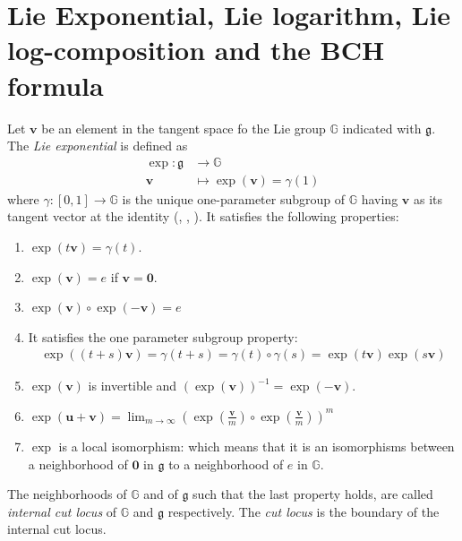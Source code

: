 \section{Lie Exponential, Lie logarithm, Lie log-composition and the BCH formula }\label{se:lie_exp_log_comp_bch}
Let $\mathbf{v}$ be an element in the tangent space fo the Lie group $\mathbb{G}$ indicated with $\mathfrak{g}$.
The \emph{Lie exponential} is defined as 
\begin{align*}
\exp :  \mathfrak{g} & \longrightarrow  \mathbb{G}  \\
\mathbf{v} &\longmapsto  \exp(\mathbf{v} ) = \gamma(1) %
\end{align*}
where $\gamma: [0,1]\rightarrow \mathbb{G} $ is the unique one-parameter subgroup of $\mathbb{G}$ having $\mathbf{v}$ as its tangent vector at the identity (\cite{do1992riemannian}, \cite{ebin2006singularities}, \cite{Arsigny:MRM:06}).
It satisfies the following properties:
\begin{enumerate}
	\item $\exp(t\mathbf{v}) =\gamma(t) $.
	\item $\exp(\mathbf{v}) = e$ if $\mathbf{v} = \mathbf{0}$.
	\item $\exp(\mathbf{v})\circ \exp(\mathbf{-v})  = e$
	\item It satisfies the one parameter subgroup property:
	\begin{align*}
	\exp((t+s)\mathbf{v}) = \gamma(t+s) = \gamma(t)\circ \gamma(s) = \exp(t\mathbf{v})\exp(s\mathbf{v})
	\end{align*}
	\item $\exp(\mathbf{v})$ is invertible and $(\exp(\mathbf{v}))^{-1} = \exp(-\mathbf{v})$.
		\item  $\exp(\mathbf{u} + \mathbf{v}) =\lim_{m\rightarrow \infty} (\exp(\frac{\mathbf{v}}{m}) \circ\exp(\frac{\mathbf{v}}{m}))^{m}$
	\item $\exp$ is a local isomorphism: which means that it is an isomorphisms between a neighborhood of $\mathbf{0}$ in $\mathfrak{g}$ to a neighborhood of $e$ in $\mathbb{G}$.
\end{enumerate}
The neighborhoods of $\mathbb{G}$ and of $\mathfrak{g}$ such that the last property holds, are called \emph{internal cut locus} of $\mathbb{G}$ and $\mathfrak{g}$ respectively. The \emph{cut locus} is the boundary of the internal cut locus.\\


